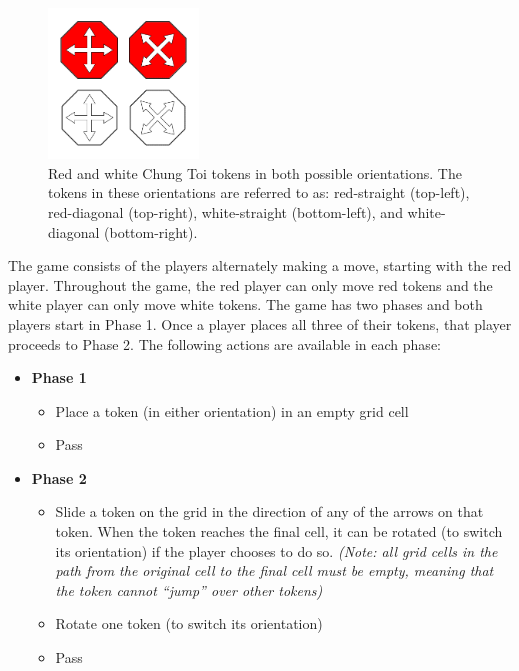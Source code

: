 \documentclass[11pt,a4paper]{report}
\begin{document}
\begin{figure}[htbp]
	\begin{center}
		\includegraphics[width=40mm]{chung_toi_tokens.png}
		\caption[Chung Toi tokens]{Red and white Chung Toi tokens in both possible orientations. The tokens in these orientations are referred to as: red-straight (top-left), red-diagonal (top-right), white-straight (bottom-left), and white-diagonal (bottom-right).}
		\label{chung-toi-tokens}
	\end{center}
\end{figure}

The game consists of the players alternately making a move, starting with the red player. Throughout the game, the red player can only move red tokens and the white player can only move white tokens. The game has two phases and both players start in Phase 1. Once a player places all three of their tokens, that player proceeds to Phase 2. The following actions are available in each phase:

\begin{itemize}

	\item \textbf{Phase 1}
		\begin{itemize}
			\item Place a token (in either orientation) in an empty grid cell
			\item Pass
		\end{itemize}

	\item \textbf{Phase 2}
		\begin{itemize}
			\item Slide a token on the grid in the direction of any of the arrows on that token. When the token reaches the final cell, it can be rotated (to switch its orientation) if the player chooses to do so. \emph{(Note: all grid cells in the path from the original cell to the final cell must be empty, meaning that the token cannot ``jump'' over other tokens)}
			\item Rotate one token (to switch its orientation)
			\item Pass
		\end{itemize}

\end{itemize}
\end{document}
